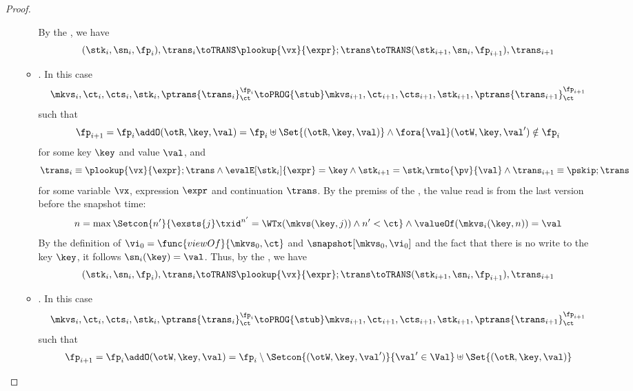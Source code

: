\begin{proof}
\begin{itemize}
\begin{itemize}
                By the , we have 
                \[
                    (\stk_i, \sn_i, \fp_i), \trans_i \toTRANS \plookup{\vx}{\expr} ; \trans 
                    \toTRANS (\stk_{i+1}, \sn_i, \fp_{i+1} ), \trans_{i+1}
                \]
            \item {}.
                In this case
                \[
                    \mkvs_i, \ct_i, \cts_i, \stk_i, \ptrans{\trans_i}_\ct^{\fp_i}
                    \toPROG{\stub}
                    \mkvs_{i+1}, \ct_{i+1}, \cts_{i+1}, \stk_{i+1}, \ptrans{\trans_{i+1}}_\ct^{\fp_{i+1}}
                \]
                such that
                \[
                    \fp_{i+1} = \fp_i \addO (\otR, \key, \val) = \fp_i \uplus \Set{(\otR, \key, \val)}
                    \land \fora{\val} (\otW,\key, \val') \notin \fp_i
                \]
                for some key \( \key \) and value \( \val \), and
                \[
                    \trans_{i} \equiv \plookup{\vx}{\expr} ; \trans 
                    \land \evalE[\stk_i]{\expr} = \key 
                    \land \stk_{i+1} = \stk_i\rmto{\pv}{\val}
                    \land  \trans_{i+1} \equiv \pskip ; \trans
                \]
                for some variable \( \vx \), expression \( \expr \) and continuation \( \trans \).
                By the premiss of the , the value read is from the last version before the snapshot time:
                \[
                    n = \max\Setcon{n'}{%
                        \exsts{j} \txid^{n'} = \WTx(\mkvs(\key, j)) \land n' < \ct%
                    } 
                    \land \valueOf(\mkvs_i(\key,n) ) = \val
                \]                 
                By the definition of \( \vi_0 = \func{viewOf}{\mkvs_0,\ct} \) and \( \snapshot[\mkvs_0,\vi_0] \) and the fact that there is no write to the key \( \key \),
                it follows \( \sn_i(\key) = \val \).
                Thus, by the , we have 
                \[
                    (\stk_i, \sn_i, \fp_i), \trans_i \toTRANS \plookup{\vx}{\expr} ; \trans 
                    \toTRANS (\stk_{i+1}, \sn_i, \fp_{i+1} ), \trans_{i+1}
                \]
            \item {}.
                In this case
                \[
                    \mkvs_i, \ct_i, \cts_i, \stk_i, \ptrans{\trans_i}_\ct^{\fp_i}
                    \toPROG{\stub}
                    \mkvs_{i+1}, \ct_{i+1}, \cts_{i+1}, \stk_{i+1}, \ptrans{\trans_{i+1}}_\ct^{\fp_{i+1}}
                \]
                such that
                \[
                    \fp_{i+1} = \fp_i \addO (\otW, \key, \val) = \fp_i \setminus \Setcon{(\otW, \key, \val')}{\val' \in \Val} \uplus \Set{(\otR, \key, \val)}
\]
\end{itemize}
\end{itemize}
\end{proof}
